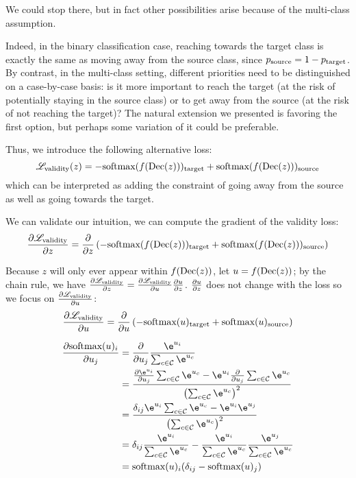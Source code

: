 \documentclass[../main.tex]{subfiles}
\begin{document}
We could stop there, but in fact other possibilities arise because of the multi-class assumption.

Indeed, in the binary classification case, reaching towards the target class is exactly the same as moving away from the source class, since $p_{\mathrm{source}} = 1 - p_{\mathrm{target}}$.
By contrast, in the multi-class setting, different priorities need to be distinguished on a case-by-case basis: is it more important to reach the target (at the risk of potentially staying in the source class) or to get away from the source (at the risk of not reaching the target)?
The natural extension we presented is favoring the first option, but perhaps some variation of it could be preferable.

Thus, we introduce the following alternative loss:
\begin{equation}
    \mathscr{L}_\text{validity}(z) = -\text{softmax}(f(\operatorname{Dec}(z)))_{\mathrm{target}}
    + \text{softmax}(f(\operatorname{Dec}(z)))_{\mathrm{source}}
\end{equation}
which can be interpreted as adding the constraint of going away from the source as well as going towards the target.

We can validate our intuition, we can compute the gradient of the validity loss:
\begin{align}
    \frac{\partial \mathscr{L}_\text{validity}}{\partial z}
    =  \frac{\partial }{\partial z} \left( - \text{softmax}(f(\operatorname{Dec}(z)))_{\mathrm{target}} + \text{softmax}(f(\operatorname{Dec}(z)))_{\mathrm{source}} \right)
\end{align}

Because $z$ will only ever appear within $f(\operatorname{Dec}(z))$, let $u = f(\operatorname{Dec}(z))$; by the chain rule, we have $\frac{\partial \mathscr{L}_\text{validity}}{\partial z} = \frac{\partial \mathscr{L}_\text{validity}}{\partial u} \frac{\partial u}{\partial z}$.
$\frac{\partial u}{\partial z}$ does not change with the loss so we focus on $\frac{\partial \mathscr{L}_\text{validity}}{\partial u}$:
\begin{align}
    \frac{\partial \mathscr{L}_\text{validity}}{\partial u}
    =  \frac{\partial }{\partial u} \left( - \text{softmax}(u)_{\mathrm{target}} + \text{softmax}(u)_{\mathrm{source}} \right)
\end{align}

{
\newcommand{\eu}[1]{\e^{u_{#1}}}
\newcommand{\seu}{\sum_{c \in \setclasses} \eu{c}}

\begin{align*}
    \grad{\softmax(u)_i}{u_j}
     & = \grad{}{u_j} \frac{\eu{i}}{\seu}                                                 \\
     & = \frac{\grad{\eu{i}}{u_j} \seu - \eu{i} \grad{}{u_j} \seu}{\left( \seu \right)^2} \\
     & = \frac{\delta_{ij} \eu{i} \seu - \eu{i} \eu{j}}{\left(\seu \right)^{2}}           \\
     & = \delta_{ij} \frac{\eu{i}}{\seu} - \frac{\eu{i}}{\seu} \frac{\eu{j}}{\seu}        \\
     & = \softmax(u)_i ( \delta_{ij}  -  \softmax(u)_j)
\end{align*}
}
\end{document}
